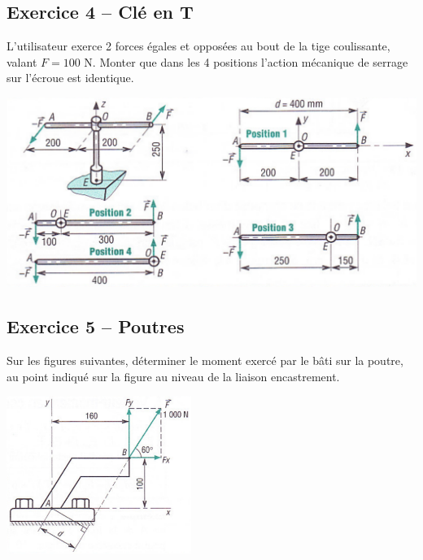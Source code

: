 \documentclass[10pt]{article}
\begin{document}
\subsection*{Exercice 4 -- Clé en T}
L'utilisateur exerce 2 forces égales et opposées au bout de la tige coulissante, valant $F=100$ N. Monter que dans les 4 positions l'action mécanique de serrage sur l'écroue est identique.
\begin{center}
\includegraphics[width=15cm]{images/moment2.pdf}
\end{center}


\subsection*{Exercice 5 -- Poutres}
Sur les figures suivantes, déterminer le moment exercé par le bâti sur la poutre, au point indiqué sur la figure au niveau de la liaison encastrement.


\begin{minipage}[c]{.45\linewidth}
\begin{center}
\includegraphics[width=6cm]{images/moment1.pdf}
\end{center}
\end{minipage} \hfill
\begin{minipage}[c]{.45\linewidth}
\begin{center}
\end{center}
\end{minipage} 
\end{document}
